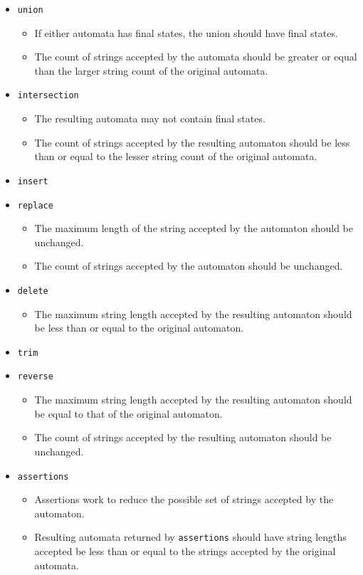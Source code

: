 \documentclass[letterpaper,11pt,twocolumn]{article}
\begin{document}
\begin{itemize}
\item{\texttt{union}}
  \begin{itemize}
  \item{If either automata has final states, the union should have final
      states.}
  \item{The count of strings accepted by the automata should be greater or
      equal than the larger string count of the original automata.}
  \end{itemize}
\item{\texttt{intersection}}
  \begin{itemize}
  \item{The resulting automata may not contain final states.}
  \item{The count of strings accepted by the resulting automaton should be less
      than or equal to the lesser string count of the original automata.}
  \end{itemize}
\item{\texttt{insert}}
\item{\texttt{replace}}
  \begin{itemize}
  \item{The maximum length of the string accepted by the automaton should be
      unchanged.}
  \item{The count of strings accepted by the automaton should be unchanged.}
  \end{itemize}
\item{\texttt{delete}}
  \begin{itemize}
    \item{The maximum string length accepted by the resulting automaton should
        be less than or equal to the original automaton.}
  \end{itemize}
\item{\texttt{trim}}
\item{\texttt{reverse}}
  \begin{itemize}
  \item{The maximum string length accepted by the resulting automaton should be
      equal to that of the original automaton.}
  \item{The count of strings accepted by the resulting automaton should be unchanged.}
  \end{itemize}
\item{\texttt{assertions}}
  \begin{itemize}
    \item{Assertions work to reduce the possible set of strings accepted by the
        automaton.}
    \item{Resulting automata returned by \texttt{assertions} should have string
        lengths accepted be less than or equal to the strings accepted by the
        original automata.}
  \end{itemize}
\end{itemize}
\end{document}
